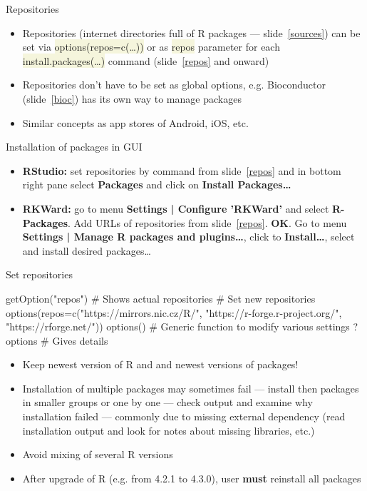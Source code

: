 \documentclass[compress, xelatex, 11pt, xcolor=svgnames, aspectratio=169,
	hyperref={
		bookmarks=true,
		unicode=true,
		colorlinks=true,
		pdftitle={Molecular data in R},
		plainpages=false,
		pdfauthor={Vojtech Zeisek},
		pdfsubject={Course about phylogeny and evolution in R},
		pdfcreator={XeLaTeX},
		pdfkeywords={R, evolution, phylogeny, molecular data},
		linkcolor=Crimson, %
		anchorcolor=Magenta, %
		citecolor=Magenta, %
		filecolor=Magenta, %
		menucolor=Magenta, %
		urlcolor=DodgerBlue, %
		},
	url={hyphens, lowtilde} %
	]{beamer}
\renewcommand{\texttt}[1]{\colorbox{Beige}{{\ttfamily #1}}}
\begin{document}
\begin{frame}{Repositories}
	\begin{itemize}
		\item Repositories (internet directories full of R packages --- slide~\ref{sources}) can be set via \texttt{options(repos=c(\ldots))} or as \texttt{repos} parameter for each \texttt{install.packages(\ldots)} command (slide~\ref{repos} and onward)
		\item Repositories don't have to be set as global options, e.g. Bioconductor (slide~\ref{bioc}) has its own way to manage packages
		\item Similar concepts as app stores of Android, iOS, etc.
	\end{itemize}
	\begin{block}{Installation of packages in GUI}
		\begin{itemize}
			\item \textbf{RStudio:} set repositories by command from slide~\ref{repos} and in bottom right pane select \textbf{Packages} and click on \textbf{Install Packages\ldots}
			\item \textbf{RKWard:} go to menu \textbf{Settings | Configure 'RKWard'} and select \textbf{R-Packages}. Add URLs of repositories from slide~\ref{repos}. \textbf{OK}. Go to menu \textbf{Settings | Manage R packages and plugins\ldots}, click to \textbf{Install\ldots}, select and install desired packages\ldots
		\end{itemize}
	\end{block}
\end{frame}

\begin{frame}[fragile]{Set repositories}
	\label{repos}
	\begin{spluscode}
    getOption("repos") # Shows actual repositories
    # Set new repositories
    options(repos=c("https://mirrors.nic.cz/R/",
      "https://r-forge.r-project.org/", "https://rforge.net/"))
    options() # Generic function to modify various settings
    ?options # Gives details
	\end{spluscode}
	\begin{itemize}
		\item \alert{Keep newest version of R and and newest versions of packages!}
		\item Installation of multiple packages may sometimes fail --- install then packages in smaller groups or one by one --- check output and examine why installation failed --- commonly due to missing external dependency (read installation output and look for notes about missing libraries, etc.)
		\item Avoid mixing of several R versions
		\item After upgrade of R (e.g. from 4.2.1 to 4.3.0), user \textbf{must} reinstall all packages
	\end{itemize}
\end{frame}
\end{document}
